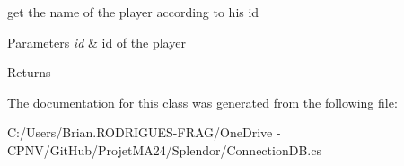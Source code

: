 get the name of the player according to his id 


\begin{DoxyParams}{Parameters}
{\em id} & id of the player\\
\hline
\end{DoxyParams}
\begin{DoxyReturn}{Returns}

\end{DoxyReturn}


The documentation for this class was generated from the following file\+:\begin{DoxyCompactItemize}
\item 
C\+:/\+Users/\+Brian.\+R\+O\+D\+R\+I\+G\+U\+E\+S-\/\+F\+R\+A\+G/\+One\+Drive -\/ C\+P\+N\+V/\+Git\+Hub/\+Projet\+M\+A24/\+Splendor/Connection\+D\+B.\+cs\end{DoxyCompactItemize}
